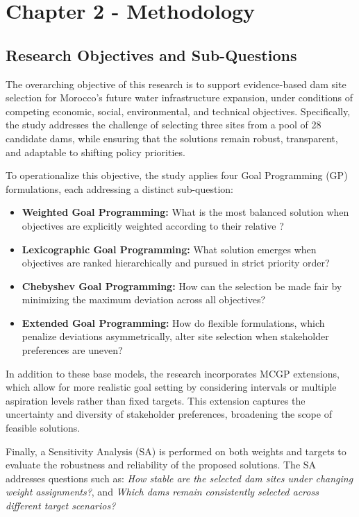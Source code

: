 \section{Chapter 2 - Methodology}\label{sec:methodology}

\subsection*{Research Objectives and Sub-Questions}
The overarching objective of this research is to support evidence-based dam site selection 
for Morocco’s future water infrastructure expansion, under conditions of competing 
economic, social, environmental, and technical objectives. Specifically, the study addresses the challenge of selecting three sites from a pool of 28 candidate dams, while ensuring that the solutions remain robust, transparent, and adaptable to shifting policy priorities.

To operationalize this objective, the study applies four Goal Programming (GP) formulations, 
each addressing a distinct sub-question:

\begin{itemize}
    \item \textbf{Weighted Goal Programming:} What is the most balanced solution when 
    objectives are explicitly weighted according to their relative      ?
    \item \textbf{Lexicographic Goal Programming:} What solution emerges when objectives 
    are ranked hierarchically and pursued in strict priority order?
    \item \textbf{Chebyshev Goal Programming:} How can the selection be made fair by 
    minimizing the maximum deviation across all objectives?
    \item \textbf{Extended Goal Programming:} How do flexible formulations, which 
    penalize deviations asymmetrically, alter site selection when stakeholder preferences 
    are uneven?
\end{itemize}

In addition to these base models, the research incorporates \gls{MCGP} extensions, which allow for more realistic goal setting by considering intervals or multiple aspiration levels rather than fixed targets. This extension captures the uncertainty and diversity of stakeholder preferences, broadening the scope of feasible solutions.

Finally, a Sensitivity Analysis (SA) is performed on both weights and targets to 
evaluate the robustness and reliability of the proposed solutions. The SA addresses questions 
such as: \textit{How stable are the selected dam sites under changing weight assignments?}, and \textit{Which dams remain consistently selected across different target scenarios?}

